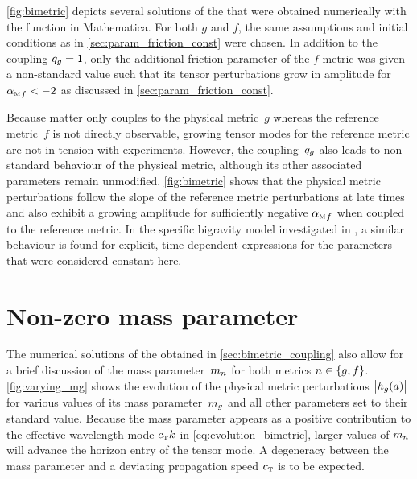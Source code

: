 \documentclass[12pt,parskip=half]{scrreprt}
\begin{document}
\autoref{fig:bimetric} depicts several solutions of the  that were obtained numerically with the  function in Mathematica. For both \(g\) and \(f\), the same assumptions and initial conditions as in \autoref{sec:param_friction_const} were chosen. In addition to the coupling \(q_{g}=1\), only the additional friction parameter of the \(f\)-metric was given a non-standard value such that its tensor perturbations grow in amplitude for \({\alpha_{\textnormal{\tiny{M}}}}_{f} < -2\) as discussed in \autoref{sec:param_friction_const}.


Because matter only couples to the physical metric~\(g\) whereas the reference metric~\(f\) is not directly observable, growing tensor modes for the reference metric are not in tension with experiments.  However, the coupling~\(q_{g}\) also leads to non-standard behaviour of the physical metric, although its other associated parameters remain unmodified. \autoref{fig:bimetric} shows that the physical metric perturbations follow the slope of the reference metric perturbations at late times and also exhibit a growing amplitude for sufficiently negative \({\alpha_{\textnormal{\tiny{M}}}}_{f}\) when coupled to the reference metric. In the specific bigravity model investigated in \cite{Amendola2015}, a similar behaviour is found for explicit, time-dependent expressions for the parameters that were considered constant here.


\section{Non-zero mass parameter}

The numerical solutions of the  obtained in \autoref{sec:bimetric_coupling} also allow for a brief discussion of the mass parameter~\(m_{n}\) for both metrics \(n \in \cbr{g,f}\). \autoref{fig:varying_mg} shows the evolution of the physical metric perturbations~\(\abs{h_{g}(a)}\) for various values of its mass parameter~\(m_{g}\) and all other parameters set to their standard value. Because the mass parameter appears as a positive contribution to the effective wavelength mode \({c_{\textnormal{\tiny{T}}}} k\) in \eqref{eq:evolution_bimetric}, larger values of \(m_{n}\) will advance the horizon entry of the tensor mode. A degeneracy between the mass parameter and a deviating propagation speed \({c_{\textnormal{\tiny{T}}}}\) is to be expected.
\end{document}
